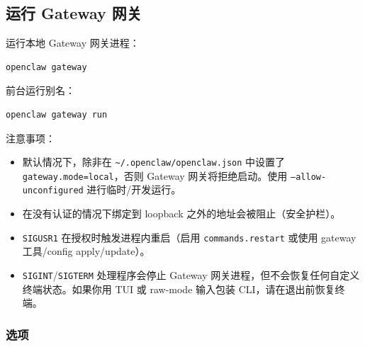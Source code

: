 \subsection{运行 Gateway 网关}


运行本地 Gateway 网关进程：

\begin{lstlisting}[language=bash]
openclaw gateway
\end{lstlisting}


前台运行别名：

\begin{lstlisting}[language=bash]
openclaw gateway run
\end{lstlisting}


注意事项：

\begin{itemize}
  \item 默认情况下，除非在 \texttt{\textasciitilde{}/.openclaw/openclaw.json} 中设置了 \texttt{gateway.mode=local}，否则 Gateway 网关将拒绝启动。使用 \texttt{--allow-unconfigured} 进行临时/开发运行。
  \item 在没有认证的情况下绑定到 loopback 之外的地址会被阻止（安全护栏）。
  \item \texttt{SIGUSR1} 在授权时触发进程内重启（启用 \texttt{commands.restart} 或使用 gateway 工具/config apply/update）。
  \item \texttt{SIGINT}/\texttt{SIGTERM} 处理程序会停止 Gateway 网关进程，但不会恢复任何自定义终端状态。如果你用 TUI 或 raw-mode 输入包装 CLI，请在退出前恢复终端。
\end{itemize}


\subsubsection{选项}


